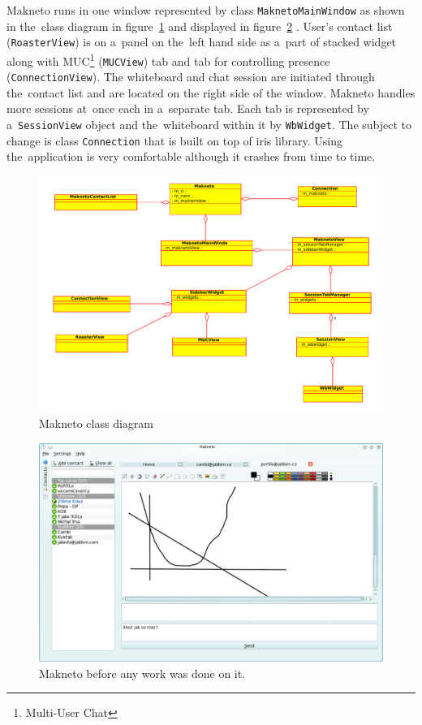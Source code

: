 Makneto runs in one window represented by class \verb|MaknetoMainWindow| as shown in the~class diagram in figure~\ref{fig:makneto-original-class-diagram} and displayed in figure~\ref{fig:makneto-original} . User's contact list (\verb|RoasterView|) is on a~panel on the~left hand side as a~part of stacked widget along with MUC\footnote{Multi-User Chat} (\verb|MUCView|) tab and tab for controlling presence (\verb|ConnectionView|). The whiteboard and chat session are initiated through the~contact list and are located on the right side of the window. Makneto handles more sessions at~once each in a~separate tab. Each tab is represented by a~\verb|SessionView| object and the~whiteboard within it by \verb|WbWidget|. The subject to change is class \verb|Connection| that is built on top of iris library. Using the~application is very comfortable although it crashes from time to time.

\begin{figure}[ht]
\begin{center}
	\includegraphics[width=15cm]{fig/makneto-orig-class-diagram.pdf}
	\caption{Makneto class diagram}
	\label{fig:makneto-original-class-diagram}
\end{center}
\end{figure}

\begin{figure}[ht]
\begin{center}
	\includegraphics[width=15cm]{fig/makneto-original.png}
	\caption{Makneto before any work was done on it.}
	\label{fig:makneto-original}
\end{center}
\end{figure}


